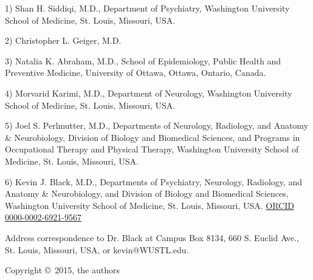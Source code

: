 1) Shan H. Siddiqi, M.D., Department of Psychiatry, Washington University School of Medicine, St. Louis, Missouri, USA.

2) Christopher L. Geiger, M.D.

3) Natalia K. Abraham, M.D., School of Epidemiology, Public Health and Preventive Medicine, University of Ottawa, Ottawa, Ontario, Canada.

4) Morvarid Karimi, M.D., Department of Neurology, Washington University School of Medicine, St. Louis, Missouri, USA.

5) Joel S. Perlmutter, M.D., Departments of Neurology, Radiology, and Anatomy & Neurobiology, Division of Biology and Biomedical Sciences, and Programs in Occupational Therapy and Physical Therapy, Washington University School of Medicine, St. Louis, Missouri, USA.

6) Kevin J. Black, M.D., Departments of Psychiatry, Neurology, Radiology, and Anatomy \& Neurobiology, and Division of Biology and Biomedical Sciences, Washington University School of Medicine, St. Louis, Missouri, USA.  \href{http://orcid.org/0000-0002-6921-9567}{ORCID 0000-0002-6921-9567}

Address correspondence to Dr. Black at Campus Box 8134, 660 S. Euclid Ave., St. Louis, Missouri, USA, or kevin@WUSTL.edu.

Copyright \copyright\, 2015, the authors